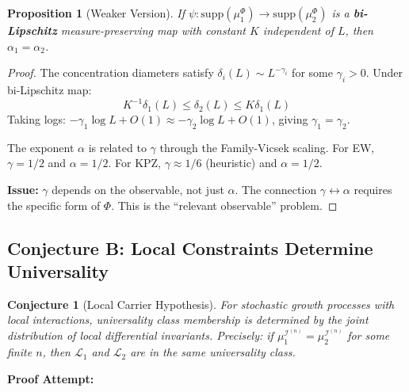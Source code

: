 \documentclass[11pt]{article}
\newtheorem{conjecture}{Conjecture}[section]
\newtheorem{proposition}[theorem]{Proposition}
\newcommand{\supp}{\mathrm{supp}}
\begin{document}
\begin{proposition}[Weaker Version]
If $\psi: \supp(\mu_1^\Phi) \to \supp(\mu_2^\Phi)$ is a \textbf{bi-Lipschitz} measure-preserving map with constant $K$ independent of $L$, then $\alpha_1 = \alpha_2$.
\end{proposition}

\begin{proof}
The concentration diameters satisfy $\delta_i(L) \sim L^{-\gamma_i}$ for some $\gamma_i > 0$. Under bi-Lipschitz map:
\[
K^{-1} \delta_1(L) \leq \delta_2(L) \leq K \delta_1(L)
\]
Taking logs: $-\gamma_1 \log L + O(1) \approx -\gamma_2 \log L + O(1)$, giving $\gamma_1 = \gamma_2$.

The exponent $\alpha$ is related to $\gamma$ through the Family-Vicsek scaling. For EW, $\gamma = 1/2$ and $\alpha = 1/2$. For KPZ, $\gamma \approx 1/6$ (heuristic) and $\alpha = 1/2$. 

\textbf{Issue:} $\gamma$ depends on the observable, not just $\alpha$. The connection $\gamma \leftrightarrow \alpha$ requires the specific form of $\Phi$. This is the ``relevant observable'' problem.
\end{proof}

\subsection{Conjecture B: Local Constraints Determine Universality}

\begin{conjecture}[Local Carrier Hypothesis]
\label{conj:local-carrier}
For stochastic growth processes with local interactions, universality class membership is determined by the joint distribution of local differential invariants. Precisely: if $\mu_1^{\mathcal{I}^{(n)}} = \mu_2^{\mathcal{I}^{(n)}}$ for some finite $n$, then $\mathcal{L}_1$ and $\mathcal{L}_2$ are in the same universality class.
\end{conjecture}

\textbf{Proof Attempt:}
\end{document}

